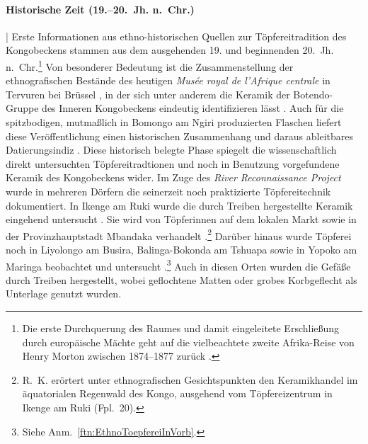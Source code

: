 \paragraph{Historische Zeit (19.--20.~Jh. n.~Chr.)}\hspace{-.5em}|\hspace{.5em}%
Erste Informationen aus ethno-historischen Quellen zur Töpfereitradition des Kongobeckens stammen aus dem ausgehenden 19. und beginnenden 20.~Jh. n.~Chr.\footnote{Die erste Durchquerung des Raumes und damit eingeleitete Erschließung durch europäische Mächte geht auf die vielbeachtete zweite Afrika-Reise von Henry Morton \textcite{Stanley.1878} zwischen 1874--1877 zurück \parencite{Eggert.2011a}.} Von besonderer Bedeutung ist die Zusammenstellung der ethnografischen Bestände des heutigen \textit{Musée royal de l'Afrique centrale} in Tervuren bei Brüssel \parencite{Coart.1907}, in der sich unter anderem die Keramik der Botendo-Gruppe des Inneren Kongobeckens eindeutig identifizieren lässt \parencite[25 Anm.~12, 157]{Wotzka.1995}. Auch für die spitzbodigen, mutmaßlich in Bomongo am Ngiri produzierten Flaschen liefert diese Veröffentlichung einen historischen Zusammenhang und daraus ableitbares Datierungsindiz \parencite[167 Abb. III.11.1; Kap.~\ref{sec:SHG-LKW_Einzelfunde}]{OmasomboTshonda.2014}. Diese historisch belegte Phase spiegelt die wissenschaftlich direkt untersuchten Töpfereitradtionen und noch in Benutzung vorgefundene Keramik des Kongobeckens wider. Im Zuge des \textit{River Reconnaissance Project} wurde in mehreren Dörfern die seinerzeit noch praktizierte Töpfereitechnik dokumentiert. In Ikenge am Ruki wurde die durch Treiben hergestellte Keramik eingehend untersucht \parencites{Eggert.1980c}{Wotzka.1991}. Sie wird von Töpferinnen auf dem lokalen Markt sowie in der Provinzhauptstadt Mbandaka verhandelt \parencites[395\,f.;]{Eggert.1980c}.\footnote{R.~K. \textcite{Eggert.1991} erörtert unter ethnografischen Gesichtspunkten den Keramikhandel im äquatorialen Regenwald des Kongo, ausgehend vom Töpfereizentrum in Ikenge am Ruki (Fpl.~20).\label{ftn:IKE_Keramikhandel}} Darüber hinaus wurde Töpferei noch in Liyolongo am Busira, Balinga-Bokonda am Tshuapa sowie in Yopoko am Maringa beobachtet und untersucht \parencite[188, 196\,f.]{Wotzka.1991}.\footnote{Siehe Anm.~\ref{ftn:EthnoToepfereiInVorb}.} Auch in diesen Orten wurden die Gefäße durch Treiben hergestellt, wobei geflochtene Matten oder grobes Korbgeflecht als Unterlage genutzt wurden.

